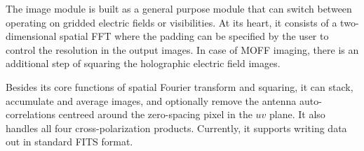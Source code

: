 \documentclass[a4paper,fleqn,usenatbib]{mnras}
\begin{document}
The image module is built as a general purpose module that can switch between 
operating on gridded electric fields or visibilities. At its heart, it consists
of a two-dimensional spatial FFT where the padding can be specified by the user 
to control the resolution in the output images. In case of MOFF imaging, there 
is an additional step of squaring the holographic electric field images. 

Besides its core functions of spatial Fourier transform and squaring, it can 
stack, accumulate and average images, and optionally remove the antenna
auto-correlations centreed around the zero-spacing pixel in the $uv$ plane. 
It also handles all four cross-polarization products. Currently, it supports 
writing data out in standard FITS format. 





\bsp	%
\label{lastpage}
\end{document}
